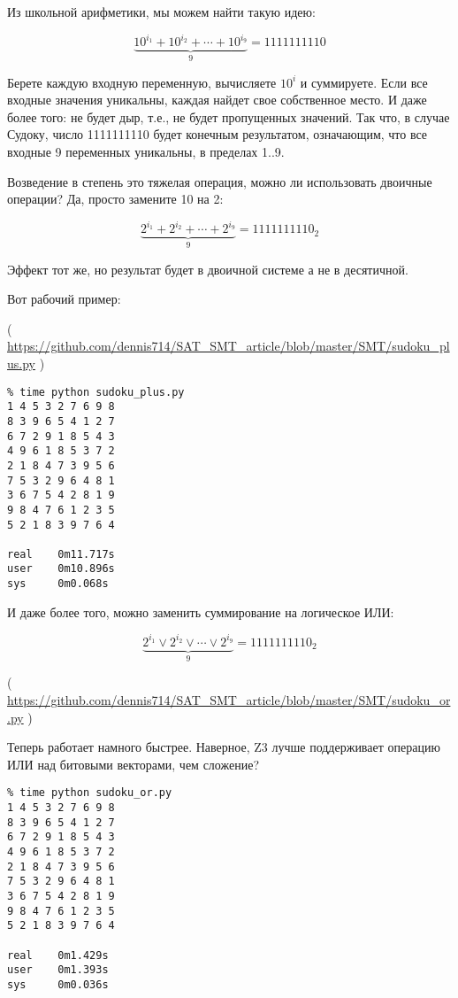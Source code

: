Из школьной арифметики, мы можем найти такую идею:

\begin{equation}
\underbrace{10^{i_1} + 10^{i_2} + \cdots + 10^{i_9}}_9 = 1111111110
\end{equation}

Берете каждую входную переменную, вычисляете $10^i$ и суммируете.
Если все входные значения уникальны, каждая найдет свое собственное место.
И даже более того: не будет дыр, т.е., не будет пропущенных значений.
Так что, в случае Судоку, число 1111111110 будет конечным результатом, означающим, что все входные
9 переменных уникальны, в пределах 1..9.

Возведение в степень это тяжелая операция, можно ли использовать двоичные операции? Да, просто замените 10 на 2:

\begin{equation}
\underbrace{2^{i_1} + 2^{i_2} + \cdots + 2^{i_9}}_9 = 1111111110_2
\end{equation}

Эффект тот же, но результат будет в двоичной системе а не в десятичной.

Вот рабочий пример:


( \url{https://github.com/dennis714/SAT_SMT_article/blob/master/SMT/sudoku_plus.py} )

\begin{lstlisting}
% time python sudoku_plus.py
1 4 5 3 2 7 6 9 8
8 3 9 6 5 4 1 2 7
6 7 2 9 1 8 5 4 3
4 9 6 1 8 5 3 7 2
2 1 8 4 7 3 9 5 6
7 5 3 2 9 6 4 8 1
3 6 7 5 4 2 8 1 9
9 8 4 7 6 1 2 3 5
5 2 1 8 3 9 7 6 4

real    0m11.717s
user    0m10.896s
sys     0m0.068s
\end{lstlisting}

И даже более того, можно заменить суммирование на логическое ИЛИ:

\begin{equation}
\underbrace{2^{i_1} \vee 2^{i_2} \vee \cdots \vee 2^{i_9}}_9 = 1111111110_2
\end{equation}


( \url{https://github.com/dennis714/SAT_SMT_article/blob/master/SMT/sudoku_or.py} )

Теперь работает намного быстрее. Наверное, Z3 лучше поддерживает операцию ИЛИ над битовыми векторами, чем сложение?

\begin{lstlisting}
% time python sudoku_or.py
1 4 5 3 2 7 6 9 8
8 3 9 6 5 4 1 2 7
6 7 2 9 1 8 5 4 3
4 9 6 1 8 5 3 7 2
2 1 8 4 7 3 9 5 6
7 5 3 2 9 6 4 8 1
3 6 7 5 4 2 8 1 9
9 8 4 7 6 1 2 3 5
5 2 1 8 3 9 7 6 4

real    0m1.429s
user    0m1.393s
sys     0m0.036s
\end{lstlisting}

